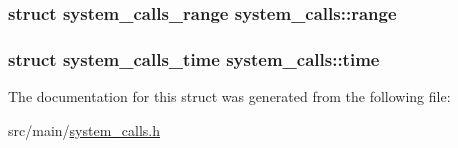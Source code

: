\hypertarget{structsystem__calls_a0f07464a12c782c790e1eb9556e861b8}{
\subsubsection[{range}]{\setlength{\rightskip}{0pt plus 5cm}struct {\bf system\+\_\+calls\+\_\+range} system\+\_\+calls\+::range}}\label{structsystem__calls_a0f07464a12c782c790e1eb9556e861b8}
\hypertarget{structsystem__calls_a3bc59e7459aa9547c7697ca289826c14}{
\subsubsection[{time}]{\setlength{\rightskip}{0pt plus 5cm}struct {\bf system\+\_\+calls\+\_\+time} system\+\_\+calls\+::time}}\label{structsystem__calls_a3bc59e7459aa9547c7697ca289826c14}


The documentation for this struct was generated from the following file\+:\begin{DoxyCompactItemize}
\item 
src/main/\hyperlink{system__calls_8h}{system\+\_\+calls.\+h}\end{DoxyCompactItemize}
